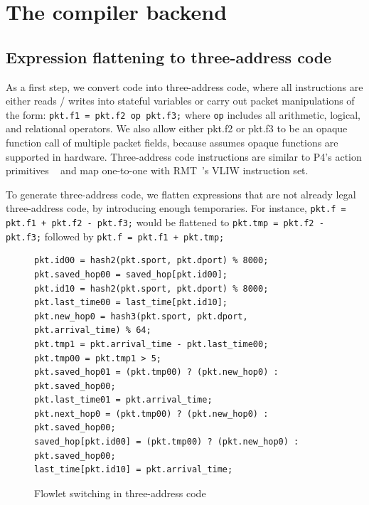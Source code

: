 \section{The \pktlanguage compiler backend}
\subsection{Expression flattening to three-address code}
As a first step, we convert code into three-address code, where all
instructions are either reads / writes into stateful variables or carry out
packet manipulations of the form: \texttt{pkt.f1 = pkt.f2 op pkt.f3;} where
\texttt{op} includes all arithmetic, logical, and relational operators. We also
allow either pkt.f2 or pkt.f3 to be an opaque function call of multiple packet
fields, because \pktlanguage assumes opaque functions are supported in
hardware. Three-address code instructions are similar to P4's action primitives
~\cite{p4spec} and map one-to-one with RMT~\cite{rmt}'s VLIW instruction set.

To generate three-address code, we flatten expressions that are not
already legal three-address code, by introducing enough temporaries. For
instance, \texttt{pkt.f = pkt.f1 + pkt.f2 - pkt.f3;} would be flattened to
\texttt{pkt.tmp = pkt.f2 - pkt.f3;} followed by \texttt{pkt.f = pkt.f1 +
pkt.tmp;}

\begin{figure}[!h]
\begin{tiny}
\begin{lstlisting}
pkt.id00 = hash2(pkt.sport, pkt.dport) % 8000;
pkt.saved_hop00 = saved_hop[pkt.id00];
pkt.id10 = hash2(pkt.sport, pkt.dport) % 8000;
pkt.last_time00 = last_time[pkt.id10];
pkt.new_hop0 = hash3(pkt.sport, pkt.dport, pkt.arrival_time) % 64;
pkt.tmp1 = pkt.arrival_time - pkt.last_time00;
pkt.tmp00 = pkt.tmp1 > 5;
pkt.saved_hop01 = (pkt.tmp00) ? (pkt.new_hop0) : pkt.saved_hop00;
pkt.last_time01 = pkt.arrival_time;
pkt.next_hop0 = (pkt.tmp00) ? (pkt.new_hop0) : pkt.saved_hop00;
saved_hop[pkt.id00] = (pkt.tmp00) ? (pkt.new_hop0) : pkt.saved_hop00;
last_time[pkt.id10] = pkt.arrival_time;
\end{lstlisting}
\end{tiny}
\caption{Flowlet switching in three-address code}
\label{fig:three_address}
\end{figure}

